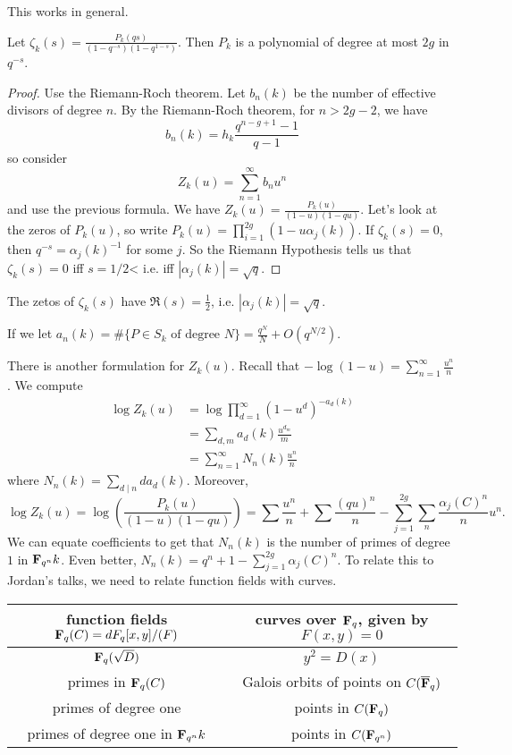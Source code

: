 This works in general. 

\begin{theorem}
Let $\zeta_k(s) = \frac{P_k(q s)}{(1-q^{-s})(1-q^{1-s})}$. Then $P_k$ is a 
polynomial of degree at most $2 g$ in $q^{-s}$. 
\end{theorem}
\begin{proof}
Use the Riemann-Roch theorem. Let $b_n(k)$ be the number of effective divisors 
of degree $n$. By the Riemann-Roch theorem, for $n>2 g-2$, we have 
\[
  b_n(k) = h_k \frac{q^{n-g+1}-1}{q-1} 
\]
so consider 
\[
  Z_k(u) = \sum_{n=1}^\infty b_n u^n 
\]
and use the previous formula. We have $Z_k(u)=\frac{P_k(u)}{(1-u)(1-q u)}$. Let's 
look at the zeros of $P_k(u)$, so write 
$P_k(u) = \prod_{i=1}^{2 g} (1-u \alpha_j(k))$. If $\zeta_k(s)=0$, then 
$q^{-s} = \alpha_j(k)^{-1}$ for some $j$. So the Riemann Hypothesis tells us that 
$\zeta_k(s)=0$ iff $s=1/2$< i.e. iff $|\alpha_j(k)|=\sqrt q$. 
\end{proof}

\begin{theorem}
The zetos of $\zeta_k(s)$ have $\Re(s)=\frac 1 2$, i.e. 
$|\alpha_j(k)| = \sqrt q$. 
\end{theorem}

\begin{corollary}
If we let $a_n(k) = \#\{P\in S_k\text{ of degree $N$}\} = \frac{q^N}{N}+O(q^{N/2})$. 
\end{corollary}

There is another formulation for $Z_k(u)$. Recall that 
$-\log(1-u) = \sum_{n=1}^\infty \frac{u^n}{n}$. We compute 
\begin{align*}
  \log Z_k(u) 
    &= \log \prod_{d=1}^\infty (1-u^d)^{-a_d(k)} \\
    &= \sum_{d,m} a_d(k) \frac{u^{d_m}}{m} \\
    &= \sum_{n=1}^\infty N_n(k) \frac{u^n}{n}
\end{align*}
where $N_n(k) = \sum_{d\mid n} d a_d(k)$. Moreover, 
\[
  \log Z_k(u) = \log\left(\frac{P_k(u)}{(1-u)(1-q u)}\right) = \sum \frac{u^n}{n} + \sum \frac{(q u)^n}{n} - \sum_{j=1}^{2 g} \sum_n \frac{\alpha_j(C)^n}{n} u^n .
\]
We can equate coefficients to get that $N_n(k)$ is the number of primes of 
degree $1$ in $\mathbf{F}_{q^n} k$. Even better, 
$N_n(k) = q^n+1 - \sum_{j=1}^{2 g} \alpha_j(C)^n$. To relate this to Jordan's 
talks, we need to relate function fields with curves. 
\begin{center}
\begin{tabular}{c|c}
function fields $\mathbf{F}_q(C)=dF_q[x,y]/(F)$ & curves over $\mathbf{F}_q$, given by $F(x,y) = 0$ \\ \hline
$\mathbf{F}_q(\sqrt D)$ & $y^2 = D(x)$ \\
primes in $\mathbf{F}_q(C)$ & Galois orbits of points on $C(\overline{\mathbf{F}}_q)$ \\
primes of degree one & points in $C(\mathbf{F}_q)$ \\
primes of degree one in $\mathbf{F}_{q^n} k$ & points in $C(\mathbf{F}_{q^n})$
\end{tabular}
\end{center}

